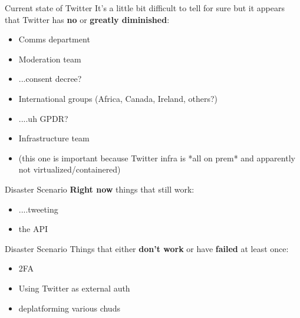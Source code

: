 \documentclass{beamer}
\begin{document}
\begin{frame}{Current state of Twitter}
	It's a little bit difficult to tell for sure but it appears that Twitter has \textbf{no} or \textbf{greatly diminished}:
	\begin{itemize}
		\pause
		\item Comms department
		\pause
		\item Moderation team
		\pause
		\item ...consent decree?
		\pause
		\item International groups (Africa, Canada, Ireland, others?)
		\pause
		\item ....uh GPDR? 
		\pause 
		\item Infrastructure team 
		\pause
		\item (this one is important because Twitter infra is *all on prem* and apparently not virtualized/containered)
	\end{itemize}
\end{frame}

\begin{frame}{Disaster Scenario}
	\textbf{Right now} things that still work:
	\begin{itemize}
		\pause
		\item ....tweeting
		\pause
		\item the API
		\pause
	\end{itemize}
\end{frame}

\begin{frame}{Disaster Scenario}
	Things that either \textbf{don't work} or have \textbf{failed} at least once:
	\begin{itemize}
		\pause
		\item 2FA
		\pause
		\item Using Twitter as external auth
		\pause
		\item deplatforming various chuds
	\end{itemize}
\end{frame}
\end{document}
